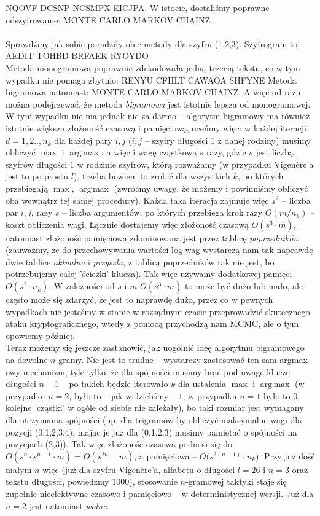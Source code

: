 \documentclass[a4paper]{article}
\DeclareMathOperator*{\argmax}{arg\,max}
\theoremstyle{defn}
\theoremstyle{theorem}
\theoremstyle{lemma}
\theoremstyle{cor}
\theoremstyle{fact}
\begin{document}
NQOVF DCSNP NCSMPX EICJPA.
W istocie, dostaliśmy poprawne odszyfrowanie:
MONTE CARLO MARKOV CHAINZ.\\
\\
Sprawdźmy jak sobie poradziły obie metody dla szyfru (1,2,3). Szyfrogram to:\\
AEDIT TOHBD BRFAEK RYOYDO\\
Metoda monogramowa poprawnie zdekodowała jedną trzecią tekstu, co w tym wypadku nie pomaga zbytnio:
RENYU CFHLT CAWAOA SHFYNE
Metoda bigramowa natomiast:
MONTE CARLO MARKOV CHAINZ. A więc od razu można podejrzewać, że metoda \textit{bigramowa} jest istotnie lepsza od monogramowej.\\
W tym wypadku nie ma jednak nic za darmo – algorytm bigramowy ma również istotnie większą złożoność czasową i pamięciową, oceńmy więc: w każdej iteracji $d=1,2.., n_k$ dla każdej pary $i,j$ ($i,j$ – szyfry długości 1 z danej rodziny) musimy obliczyć $\max$ i $\argmax$, a więc i wagę cząstkową $s$ razy, gdzie $s$ jest liczbą szyfrów długości $1$ w  rodzinie szyfrów, którą rozważamy (w przypadku Vigenère'a jest to po prostu $l$), trzeba bowiem to zrobić dla wszystkich $k$, po których przebiegają $\max$, $\argmax$ (zwróćmy uwagę, że możemy i powinniśmy obliczyć oba wewnątrz tej samej procedury). Każda taka iteracja zajmuje więc $s^2$ – liczba par $i,j$, razy $s$ – liczba argumentów, po których przebiega krok razy $O(m/n_k)$ – koszt obliczenia wagi. Łącznie dostajemy więc złożoność czasową $O(s^3 \cdot m)$, natomiast złożoność pamięciowa zdominowana jest przez tablicę \textit{poprzedników} (zauważmy, że do przechowywania wartości log-wag wystarczą nam tak naprawdę dwie tablice \textit{aktualna} i \textit{przyszła}, z tablicą poprzedników tak nie jest, bo potrzebujemy całej 'ścieżki' klucza). Tak więc używamy dodatkowej pamięci $O(s^2 \cdot n_k)$. W zależności od $s$ i $m$ $O(s^3 \cdot m)$ to może być dużo lub mało, ale często może się zdarzyć, że jest to naprawdę dużo, przez co w pewnych wypadkach nie jesteśmy w stanie w rozsądnym czasie przeprowadzić skutecznego ataku kryptograficznego, wtedy z pomocą przychodzą nam MCMC, ale o tym opowiemy później.\\
Teraz możemy się jeszcze zastanowić, jak uogólnić ideę algorytmu bigramowego na dowolne $n$-gramy. Nie jest to trudne – wystarczy zastosować ten sam argmax-owy mechanizm, tyle tylko, że dla spójności musimy brać pod uwagę klucze długości $n-1$ – po takich będzie iterowało $k$ dla ustalenia $\max$ i $\argmax$ (w przypadku $n=2$, było to – jak widzieliśmy – $1$, w przypadku $n=1$ było to $0$, kolejne 'cząstki' w ogóle od siebie nie zależały), bo taki rozmiar jest wymagany dla utrzymania spójności (np. dla trigramów by obliczyć maksymalne wagi dla pozycji (0,1,2,3,4), mając je już dla (0,1,2,3) musimy pamiętać o spójności na pozycjach (2,3)). Tak więc złożoność czasowa podnosi się do $O(s^n \cdot s^{n-1} \cdot m) = O(s^{2n-1}m)$, a pamięciowa – $O(s^{2(n-1)} \cdot n_k$). Przy już dość małym $n$ więc (już dla szyfru Vigenère'a, alfabetu o długości $l=26$ i $n=3$ oraz tekstu długości, powiedzmy 1000), stosowanie $n$-gramowej taktyki staje się zupełnie nieefektywne czasowo i pamięciowo – w deterministycznej wersji. Już dla $n=2$ jest natomiast \textit{wolne}.\\
\end{document}
